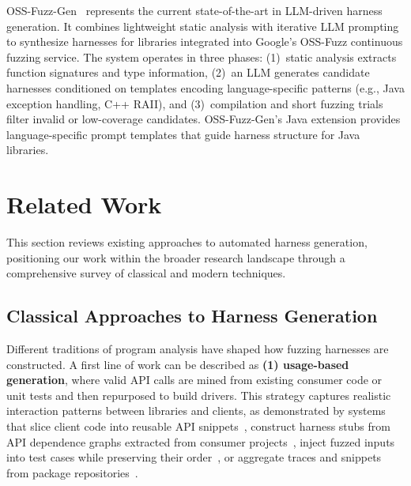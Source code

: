 \documentclass[sigconf,review,anonymous]{acmart}
\begin{document}
OSS-Fuzz-Gen~\cite{CITE:OSSFuzzGen} represents the current state-of-the-art in LLM-driven harness generation. It combines lightweight static analysis with iterative LLM prompting to synthesize harnesses for libraries integrated into Google's OSS-Fuzz continuous fuzzing service. The system operates in three phases: (1)~static analysis extracts function signatures and type information, (2)~an LLM generates candidate harnesses conditioned on templates encoding language-specific patterns (e.g., Java exception handling, C++ RAII), and (3)~compilation and short fuzzing trials filter invalid or low-coverage candidates.
OSS-Fuzz-Gen's Java extension provides language-specific prompt templates that guide harness structure for Java libraries. 









\section{Related Work}
\label{sec:related-work}

This section reviews existing approaches to automated harness generation, positioning our work within the broader research landscape through a comprehensive survey of classical and modern techniques.

\subsection{Classical Approaches to Harness Generation}
\label{subsec:classical-harness-generation}



Different traditions of program analysis have shaped how fuzzing harnesses are constructed. A first line of work can be described as \textbf{(1) usage-based generation}, where valid API calls are mined from existing consumer code or unit tests and then repurposed to build drivers. This strategy captures realistic interaction patterns between libraries and clients, as demonstrated by systems that slice client code into reusable API snippets~\cite{DBLP:conf/sigsoft/BabicBCIKKLSW19:FUDGE}, construct harness stubs from API dependence graphs extracted from consumer projects~\cite{DBLP:conf/uss/IspoglouAMP20:FuzzGen}, inject fuzzed inputs into test cases while preserving their order~\cite{DBLP:conf/sp/JeongJYMKJKSH23:UTopia}, or aggregate traces and snippets from package repositories~\cite{DBLP:journals/pacmse/WuNH25:WildSync, DBLP:conf/icse/ZhangZLWLZJ23:Daisy}.
\end{document}
